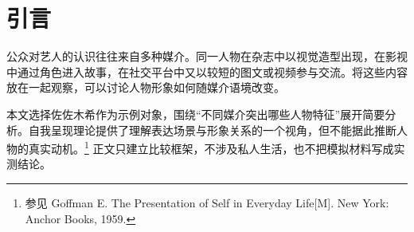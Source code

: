 \chapter*{引言}
公众对艺人的认识往往来自多种媒介。同一人物在杂志中以视觉造型出现，在影视中通过角色进入故事，在社交平台中又以较短的图文或视频参与交流。将这些内容放在一起观察，可以讨论人物形象如何随媒介语境改变。

本文选择佐佐木希作为示例对象，围绕“不同媒介突出哪些人物特征”展开简要分析。自我呈现理论提供了理解表达场景与形象关系的一个视角，但不能据此推断人物的真实动机。\footnote{参见 Goffman E. The Presentation of Self in Everyday Life[M]. New York: Anchor Books, 1959.}
正文只建立比较框架，不涉及私人生活，也不把模拟材料写成实测结论。
